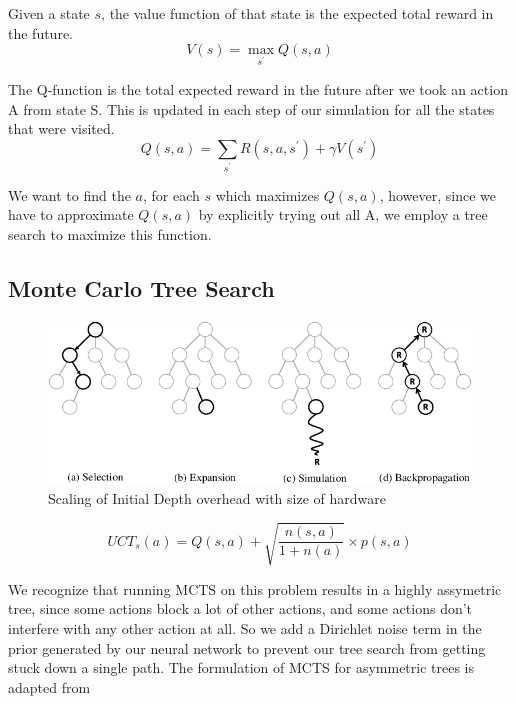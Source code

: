\documentclass[%
 reprint,
 amsmath,amssymb,
 aps,
]{revtex4-2}
\begin{document}
Given a state $s$, the value function of that state is the expected total reward in the future.
\begin{equation}
    V(s) = \max_{s^\prime} Q(s, a)
\end{equation}

The Q-function is the total expected reward in the future after we took an action A from state S. This is updated in each step of our simulation for all the states that were visited.
\begin{equation}
    Q(s, a) = \sum_{s^\prime} R(s, a, s^\prime) + \gamma V(s^\prime)
\end{equation}

We want to find the $a$, for each $s$ which maximizes $Q(s, a)$, however, since we have to approximate $Q(s, a)$ by explicitly trying out all A, we employ a tree search to maximize this function.

\subsection{\label{sec:method-mcts}Monte Carlo Tree Search}

\begin{figure}[H]
    \includegraphics[width=\linewidth]{images/mcts-explainer.jpg}
    \caption{\label{fig:mcts-explainer}
        Scaling of Initial Depth overhead with size of hardware}
\end{figure}

\begin{equation}
    UCT_s(a) = Q(s, a) + \sqrt{\frac{n(s, a)}{1 + n(a)}} \times p(s, a)
\end{equation}

We recognize that running MCTS on this problem results in a highly assymetric tree, since some actions block a lot of other actions, and some actions don't interfere with any other action at all. So we add a Dirichlet noise term in the prior generated by our neural network to prevent our tree search from getting stuck down a single path. The formulation of MCTS for asymmetric trees is adapted from \citet{mcts_assymetric}
\end{document}
